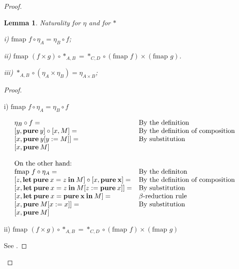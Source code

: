 \documentclass[a4paper]{article}
\newtheorem{lemma}{Lemma}
\begin{document}
\begin{proof}
\begin{lemma} Naturality for $\eta$ and for $\ast$

  i) $\text{fmap } f \circ \eta_A = \eta_B \circ f$;

  ii) $\text{fmap } (f \times g) \circ \ast_{A, B} = \ast_{C,D} \circ (\text{fmap } f) \times (\text{fmap } g)$.

  iii) $\ast_{A,B} \circ (\eta_{A} \times \eta_{B}) = \eta_{A \times B}$;
\end{lemma}

\begin{proof}
  $ $

  i) $\text{fmap } f \circ \eta_A = \eta_B \circ f$

\vspace{\baselineskip}

$\begin{array}{lll}
&\eta_B \circ f = & \text{By the definition} \\
&[y, {\bf pure \:} y] \circ [x, M] = & \text{By the definition of composition}\\
&[x, {\bf pure \:} y [y := M]] = & \text{By substitution}\\
&[x, {\bf pure \:} M]& \\
& &\\
&\text{On the other hand:}& \\
&\text{fmap } f \circ \eta_A = & \text{By the definiton} \\
&[z, {\bf let \: pure \:} x = z {\: \bf in \:} M] \circ [x, {\bf pure \: x}] = & \text{By the definition of composition}\\
&[x, {\bf let \: pure \:} x = z {\: \bf in \:} M [z := {\bf pure \:} x]] = & \text{By substitution} \\
&[x, {\bf let \: pure \:} x = {\bf pure \: x} {\: \bf in \:} M] = & \text{$\beta$-reduction rule}\\
&[x, {\bf pure \:} M [x := x]] = & \text{By substitution}\\
&[x, {\bf pure \:} M]&
\end{array}$

\vspace{\baselineskip}

ii)  $\text{fmap } (f \times g) \circ \ast_{A, B} = \ast_{C,D} \circ (\text{fmap } f) \times (\text{fmap } g)$

\vspace{\baselineskip}

See \cite{ModalK}.

\vspace{\baselineskip}


\end{proof}
\end{proof}
\end{document}
